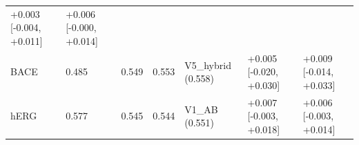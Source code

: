 \documentclass[
  10pt,
]{article}
\begin{document}
\begin{longtable}[]{@{}lllllll@{}}
\begin{minipage}[t]{0.12\columnwidth}
+0.003 {[}-0.004, +0.011{]}\strut
\end{minipage} & \begin{minipage}[t]{0.12\columnwidth}\raggedright
+0.006 {[}-0.000, +0.014{]}\strut
\end{minipage}\tabularnewline
\begin{minipage}[t]{0.12\columnwidth}\raggedright
BACE\strut
\end{minipage} & \begin{minipage}[t]{0.12\columnwidth}\raggedright
0.485\strut
\end{minipage} & \begin{minipage}[t]{0.12\columnwidth}\raggedright
0.549\strut
\end{minipage} & \begin{minipage}[t]{0.12\columnwidth}\raggedright
0.553\strut
\end{minipage} & \begin{minipage}[t]{0.12\columnwidth}\raggedright
V5\_hybrid (0.558)\strut
\end{minipage} & \begin{minipage}[t]{0.12\columnwidth}\raggedright
+0.005 {[}-0.020, +0.030{]}\strut
\end{minipage} & \begin{minipage}[t]{0.12\columnwidth}\raggedright
+0.009 {[}-0.014, +0.033{]}\strut
\end{minipage}\tabularnewline
\begin{minipage}[t]{0.12\columnwidth}\raggedright
hERG\strut
\end{minipage} & \begin{minipage}[t]{0.12\columnwidth}\raggedright
0.577\strut
\end{minipage} & \begin{minipage}[t]{0.12\columnwidth}\raggedright
0.545\strut
\end{minipage} & \begin{minipage}[t]{0.12\columnwidth}\raggedright
0.544\strut
\end{minipage} & \begin{minipage}[t]{0.12\columnwidth}\raggedright
V1\_AB (0.551)\strut
\end{minipage} & \begin{minipage}[t]{0.12\columnwidth}\raggedright
+0.007 {[}-0.003, +0.018{]}\strut
\end{minipage} & \begin{minipage}[t]{0.12\columnwidth}\raggedright
+0.006 {[}-0.003, +0.014{]}\strut
\end{minipage}\tabularnewline

\end{longtable}
\end{document}
